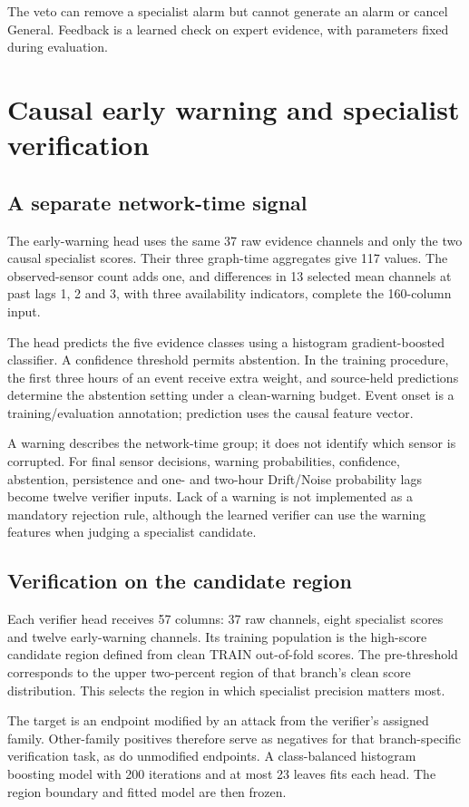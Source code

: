 The veto can remove a specialist alarm but cannot generate an alarm or cancel General. Feedback is a learned check on expert evidence, with parameters fixed during evaluation.

\section{Causal early warning and specialist verification}
\subsection{A separate network-time signal}
The early-warning head uses the same 37 raw evidence channels and only the two causal specialist scores. Their three graph-time aggregates give 117 values. The observed-sensor count adds one, and differences in 13 selected mean channels at past lags 1, 2 and 3, with three availability indicators, complete the 160-column input.

The head predicts the five evidence classes using a histogram gradient-boosted classifier. A confidence threshold permits abstention. In the training procedure, the first three hours of an event receive extra weight, and source-held predictions determine the abstention setting under a clean-warning budget. Event onset is a training/evaluation annotation; prediction uses the causal feature vector.

A warning describes the network-time group; it does not identify which sensor is corrupted. For final sensor decisions, warning probabilities, confidence, abstention, persistence and one- and two-hour Drift/Noise probability lags become twelve verifier inputs. Lack of a warning is not implemented as a mandatory rejection rule, although the learned verifier can use the warning features when judging a specialist candidate.

\subsection{Verification on the candidate region}
Each verifier head receives 57 columns: 37 raw channels, eight specialist scores and twelve early-warning channels. Its training population is the high-score candidate region defined from clean TRAIN out-of-fold scores. The pre-threshold corresponds to the upper two-percent region of that branch's clean score distribution. This selects the region in which specialist precision matters most.

The target is an endpoint modified by an attack from the verifier's assigned family. Other-family positives therefore serve as negatives for that branch-specific verification task, as do unmodified endpoints. A class-balanced histogram boosting model with 200 iterations and at most 23 leaves fits each head. The region boundary and fitted model are then frozen.


